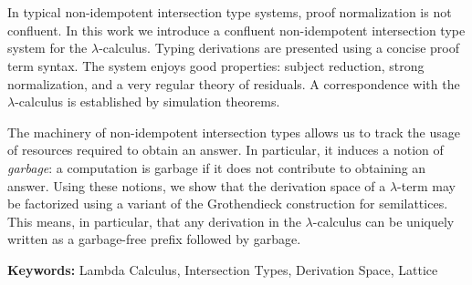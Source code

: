 \section*{}
In typical non-idempotent intersection type systems, proof normalization is not confluent.
In this work we introduce a confluent non-idempotent intersection type system for the $\lambda$-calculus.
Typing derivations are presented using a concise proof term syntax.
The system enjoys good properties: subject reduction, strong normalization,
and a very regular theory of residuals.
A correspondence with the $\lambda$-calculus is established by simulation theorems.

The machinery of non-idempotent intersection types allows us to track the usage of
resources required to obtain an answer.
In particular, it induces a notion of \textit{garbage}: a computation is garbage
if it does not contribute to obtaining an answer.
Using these notions,
we show that the derivation space of a $\lambda$-term may be factorized using a
variant of the Grothendieck construction for semilattices.
This means, in particular, that any derivation in the $\lambda$-calculus can be
uniquely written as a garbage-free prefix followed by garbage.


\vspace{2cm}
\noindent
\textbf{Keywords:} Lambda Calculus, Intersection Types, Derivation Space, Lattice
